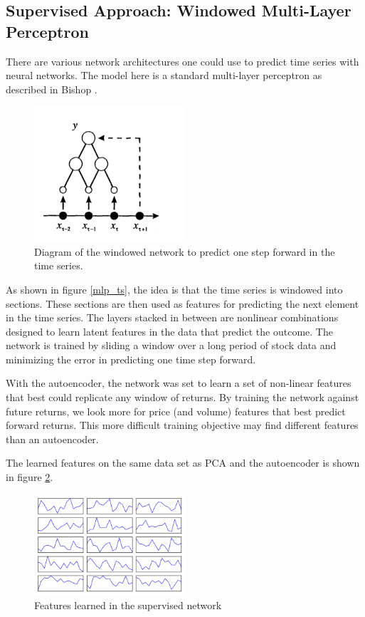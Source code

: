 \documentclass{article}
\begin{document}
\subsection{Supervised Approach: Windowed Multi-Layer Perceptron}

There are various network architectures one could use to predict time
series with neural networks. The model here is a standard multi-layer
perceptron as described in Bishop \cite{bishop1995neural}.

\begin{figure}[h]
    \includegraphics[width=0.5\textwidth]{bishop_ts_nn}
    \caption{Diagram of the windowed network to predict one step forward in the
    time series.}
    \label{fig:mlp_ts}
\end{figure}

As shown in figure \ref{mlp_ts}, the idea is that the time series is windowed
into sections. These sections are then used as features for predicting the next
element in the time series. The layers stacked in between are nonlinear
combinations designed to learn latent features in the data that predict the
outcome. The network is trained by sliding a window over a long period of stock
data and minimizing the error in predicting one time step forward.

With the autoencoder, the network was set to learn a set of non-linear features
that best could replicate any window of returns. By training the network 
against future returns, we look more for price (and volume)
features that best predict forward returns. This more difficult training
objective may find different features than an autoencoder. 

The learned features on the same data set as PCA and the autoencoder is shown in
figure \ref{fig:mlp_feats}.

\begin{figure}[h]
    \includegraphics[width=0.5\textwidth]{mlp_feats}
    \caption{Features learned in the supervised network}
    \label{fig:mlp_feats}
\end{figure}
\end{document}
